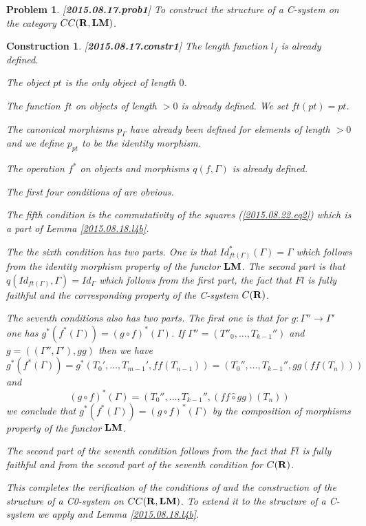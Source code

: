\documentclass[11pt]{article}
\newtheorem{problem}[proposition]{Problem}
\newtheorem{construction}[proposition]{Construction}
\newcommand{\llabel}[1]{\label{#1}[{\bf #1}]}
\newcommand{\sr}{\rightarrow}
\newcommand{\rr}{{\bf R}}
\newcommand{\lm}{{\bf LM}}
\newcommand{\wh}{\widehat}
\newcommand{\hc}{\wh{\circ}}
\begin{document}
%
\begin{problem}\llabel{2015.08.17.prob1}
To construct the structure of a C-system on the category $CC(\rr,\lm)$.
\end{problem}
%
\begin{construction}\rm
\llabel{2015.08.17.constr1}
The length function $l_f$ is already defined.

The object $pt$ is the only object of length $0$.

The function $ft$ on objects of length $>0$ is already defined.  We set $ft(pt)=pt$.  

The canonical morphisms $p_{\Gamma}$ have already been defined for elements of length $>0$ and we define $p_{pt}$ to be the identity morphism.

The operation $f^*$ on objects and morphisms $q(f,\Gamma)$ is already defined.

The first four conditions of \cite[Definition 2.1]{Csubsystems} are obvious. 

The fifth condition is the commutativity of the squares (\ref{2015.08.22.eq2}) which is a part of Lemma \ref{2015.08.18.l4b}. 

The the sixth condition has two parts. One is that $Id_{ft(\Gamma)}^*(\Gamma)=\Gamma$ which follows from the identity morphism property of the functor $\lm$. The second part is that $q(Id_{ft(\Gamma)},\Gamma)=Id_{\Gamma}$ which follows from the first part, the fact that $Fl$ is fully faithful and the corresponding property of the C-system $C(\rr)$.

The seventh conditions also has two parts. The first one is that for $g:\Gamma''\sr \Gamma'$ one has $g^*(f^*(\Gamma))=(g\circ f)^*(\Gamma)$. If $\Gamma''=(T''_0,\dots,T_{k-1}'')$ and $g=((\Gamma'',\Gamma'),gg)$ then we have
%
$$g^*(f^*(\Gamma))=g^*(T_0',\dots,T_{m-1}',ff(T_{n-1}))=(T_0'',\dots,T_{k-1}'',gg(ff(T_n)))$$
%
and
%
$$(g\circ f)^*(\Gamma)=(T_0'',\dots,T_{k-1}'',(ff\hc gg)(T_n))$$
%
we conclude that $g^*(f^*(\Gamma))=(g\circ f)^*(\Gamma)$ by the composition of morphisms property of the functor $\lm$. 

The second part of the seventh condition follows from the fact that $Fl$ is fully faithful and from the second part of the seventh condition for $C(\rr)$.

This completes the verification of the conditions of \cite[Definition 2.1]{Csubsystems} and the construction of the structure of a C0-system on $CC(\rr,\lm)$. To extend it to the structure of a C-system we apply \cite[Proposition 2.4]{Csubsystems} and Lemma \ref{2015.08.18.l4b}. 
\end{construction}
%
%
%
\end{document}
